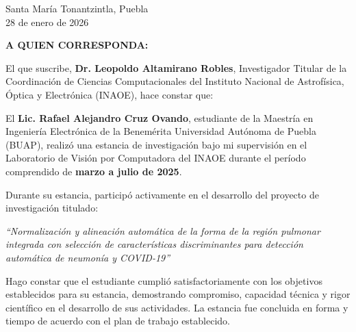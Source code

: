 \documentclass[11pt,letterpaper]{article}
\begin{document}
\begin{flushright}
Santa María Tonantzintla, Puebla\\
28 de enero de 2026
\end{flushright}

\vspace{0.6cm}

\noindent\textbf{A QUIEN CORRESPONDA:}

\vspace{0.5cm}

\noindent
El que suscribe, \textbf{Dr. Leopoldo Altamirano Robles}, Investigador Titular de la Coordinación de Ciencias Computacionales del Instituto Nacional de Astrofísica, Óptica y Electrónica (INAOE), hace constar que:

\vspace{0.4cm}

\noindent
El \textbf{Lic. Rafael Alejandro Cruz Ovando}, estudiante de la Maestría en Ingeniería Electrónica de la Benemérita Universidad Autónoma de Puebla (BUAP), realizó una estancia de investigación bajo mi supervisión en el Laboratorio de Visión por Computadora del INAOE durante el período comprendido de \textbf{marzo a julio de 2025}.

\vspace{0.4cm}

\noindent
Durante su estancia, participó activamente en el desarrollo del proyecto de investigación titulado:

\vspace{0.2cm}

\begin{center}
\textit{``Normalización y alineación automática de la forma de la región pulmonar integrada con selección de características discriminantes para detección automática de neumonía y COVID-19''}
\end{center}

\vspace{0.2cm}

\noindent
Hago constar que el estudiante cumplió satisfactoriamente con los objetivos establecidos para su estancia, demostrando compromiso, capacidad técnica y rigor científico en el desarrollo de sus actividades. La estancia fue concluida en forma y tiempo de acuerdo con el plan de trabajo establecido.
\end{document}
